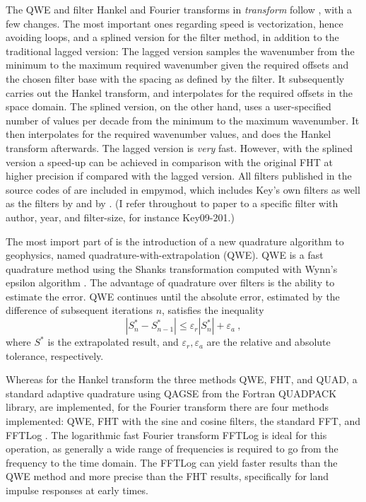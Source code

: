\documentclass[paper]{geophysics}
\begin{document}
The QWE and filter Hankel and Fourier transforms in \emph{transform} follow
\cite{GEO.12.Key}, with a few changes. The most important ones regarding speed
is vectorization, hence avoiding loops, and a splined version for the filter
method, in addition to the traditional lagged version: The lagged version
samples the wavenumber from the minimum to the maximum required wavenumber
given the required offsets and the chosen filter base with the spacing as
defined by the filter. It subsequently carries out the Hankel transform, and
interpolates for the required offsets in the space domain. The splined version,
on the other hand, uses a user-specified number of values per decade from the
minimum to the maximum wavenumber. It then interpolates for the required
wavenumber values, and does the Hankel transform afterwards. The lagged version
is \emph{very} fast. However, with the splined version a speed-up can be
achieved in comparison with the original FHT at higher precision if compared
with the lagged version. All filters published in the source codes of
\cite{GEO.09.Key, GEO.12.Key} are included in empymod, which includes Key's own
filters as well as the filters by \cite{TMS.82.Anderson} and by
\cite{GP.07.Kong}. (I refer throughout to paper to a specific filter with
author, year, and filter-size, for instance Key09-201.)

The most import part of \cite{GEO.12.Key} is the introduction of a new
quadrature algorithm to geophysics, named
qua\-dra\-ture-with-ex\-tra\-po\-la\-tion (QWE). QWE is a fast quadrature
method using the Shanks transformation \citep{JMP.55.Shanks} computed with
Wynn's epsilon algorithm \citep{MC.56.Wynn}. The advantage of quadrature over
filters is the ability to estimate the error. QWE continues until the absolute
error, estimated by the difference of subsequent iterations $n$, satisfies the
inequality
%
\begin{equation}
  |S^*_n-S^*_{n-1}| \le \varepsilon_r|S^*_n| + \varepsilon_a\ ,
  \label{eq:err}
\end{equation}
%
where $S^*$ is the extrapolated result, and $\varepsilon_r, \varepsilon_a$ are
the relative and absolute tolerance, respectively.

Whereas for the Hankel transform the three methods QWE, FHT, and QUAD, a
standard adaptive quadrature using QAGSE from the Fortran QUADPACK library, are
implemented, for the Fourier transform there are four methods implemented: QWE,
FHT with the sine and cosine filters, the standard FFT, and FFTLog
\citep{RAS.00.Hamilton}. The logarithmic fast Fourier transform FFTLog is
ideal for this operation, as generally a wide range of frequencies is required
to go from the frequency to the time domain. The FFTLog can yield faster
results than the QWE method and more precise than the FHT results, specifically
for land impulse responses at early times.
\end{document}
